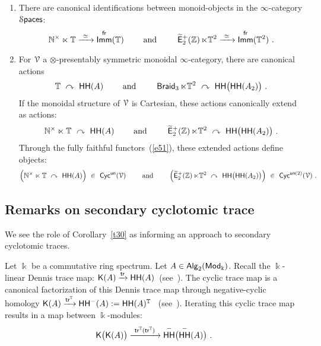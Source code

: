 \documentclass{amsart}
\theoremstyle{definition}
\theoremstyle{remark}
\DeclareMathOperator{\Alg}{\sf Alg}
\DeclareMathOperator{\Mod}{\sf Mod}
\newcommand{\lacts}{\curvearrowright}
\DeclareMathOperator{\Spaces}{\cS\mathsf{paces}}
\DeclareMathOperator{\fr}{\sf fr}
\def\ot{\otimes}
\newcommand{\w}{\widetilde}
\newcommand{\xra}{\xrightarrow}
\DeclareMathOperator{\Braid}{{\sf Braid}_3}
\DeclareMathOperator{\Ebraid}{\w{\sf E}_{2}^{+}(\ZZ)}
\DeclareMathOperator{\sHH}{\sf HH}
\DeclareMathOperator{\Imm}{\sf Imm}
\begin{document}
{\begin{enumerate}
\item
There are canonical identifications between monoid-objects in the $\infty$-category $\Spaces$:
\[
\NN^\times \ltimes \TT
\xra{~\simeq~}
\Imm^{\fr}(\TT)
\qquad
\text{ and }
\qquad
\Ebraid \ltimes \TT^2
\xra{~\simeq~}
\Imm^{\fr}(\TT^2)
~.
\]

\item
For $\mathcal V$ a $\ot$-presentably symmetric monoidal $\infty$-category, there are canonical actions
\[
\TT
~\lacts~
\sHH(A)
\qquad
\text{ and }
\qquad
\Braid
\ltimes \TT^2 
~\lacts~
\sHH\bigl( \sHH(A_2) \bigr)
~.
\]
If the monoidal structure of $\mathcal V$ is Cartesian, these actions canonically extend as actions:
\[
\NN^\times \ltimes \TT
~\lacts~
\sHH(A)
\qquad
\text{ and }
\qquad
\Ebraid \ltimes \TT^2 
~\lacts~
\sHH\bigl( \sHH(A_2) \bigr)
~.
\]
Through the fully faithful functors~(\ref{e51}), these extended actions define objects:
\[
\Bigl(
\NN^\times \ltimes \TT 
~\lacts~
\sHH(A)
\Bigr)
~\in~
{\sf Cyc}^{\sf un}(\cV)
\qquad
\text{ and }
\qquad
\Bigl(
 \Ebraid \ltimes \TT^2
~\lacts~
\sHH\bigl( \sHH(A_2) \bigr)
\Bigr)
~\in~
{\sf Cyc}^{{\sf un} (2)}(\cV)
~.
\]


\end{enumerate}
}











\subsection{Remarks on secondary cyclotomic trace}


We see the role of Corollary~\ref{t30} as informing an approach to secondary cyclotomic traces.  

Let $\Bbbk$ be a commutative ring spectrum.
Let $A\in \Alg_2(\Mod_{\Bbbk})$.
Recall the $\Bbbk$-linear Dennis trace map: $\sK(A) \xra{{\sf tr}} \sHH(A)$~(see~\cite{??}).
The cyclic trace map is a canonical factorization of this Dennis trace map through negative-cyclic homology
$
\sK(A)
\xra{{\sf tr}^{\TT}}
{\sHH}^-(A)
:=
\sHH(A)^{\TT}
$
~(see~\cite{??  look in ``cyclo'' for a citation}).
Iterating this cyclic trace map results in a map between $\Bbbk$-modules:
\[
\sK\bigl( \sK(A) \bigr)
\xra{~{\sf tr}^{\TT}( {\sf tr}^{\TT})~}
\sHH^-\bigl( \sHH^-(A)\bigr)
~.
\]
\end{document}
